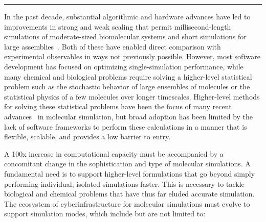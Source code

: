 \documentclass[10pt,letterpaper,draft]{article}
\begin{document}


\hspace{1.5cm}\rule{13.0cm}{0.8pt}

\vspace{0.5cm}

In the past decade, substantial algorithmic and hardware advances have led to
improvements in strong and weak scaling that permit millisecond-length
simulations of moderate-sized biomolecular systems and short simulations for
large assemblies~\cite{kasson2}.  Both of these have enabled direct comparison with
experimental observables in ways not previously possible.  However, most
software development has focused on optimizing single-simulation performance,
while many chemical and biological problems require solving a higher-level
statistical problem such as the stochastic behavior of large ensembles of
molecules or the statistical physics of a few molecules over longer timescales.
Higher-level methods for solving these statistical problems have been the focus
of many recent advances~\cite{kasson1} in molecular simulation, but broad adoption has been
limited by the lack of software frameworks to perform these calculations in a
manner that is flexible, scalable, and provides a low barrier to entry.


A 100x increase in computational capacity must be accompanied by a concomitant
change in the sophistication and type of molecular simulations. A fundamental
need is to support higher-level formulations that go beyond simply performing
individual, isolated simulations faster.
This is necessary to tackle biological and chemical problems that have thus far
eluded accurate simulation.  The ecosystem of cyberinfrastructure for molecular
simulations must evolve to support simulation modes, which include but are not
limited to:
\end{document}
